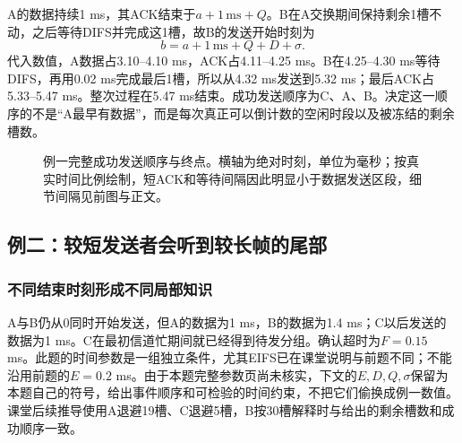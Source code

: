 A的数据持续1 ms，其ACK结束于$a+1\,\mathrm{ms}+Q$。B在A交换期间保持剩余1槽不动，之后等待DIFS并完成这1槽，故B的发送开始时刻为
\begin{equation}
b=a+1\,\mathrm{ms}+Q+D+\sigma.
\end{equation}
代入数值，A数据占3.10--4.10 ms，ACK占4.11--4.25 ms。B在4.25--4.30 ms等待DIFS，再用0.02 ms完成最后1槽，所以从4.32 ms发送到5.32 ms；最后ACK占5.33--5.47 ms。整次过程在5.47 ms结束。成功发送顺序为C、A、B。决定这一顺序的不是“A最早有数据”，而是每次真正可以倒计数的空闲时段以及被冻结的剩余槽数。

\begin{figure}[htbp]
\centering
{}
\caption{例一完整成功发送顺序与终点。横轴为绝对时刻，单位为毫秒；按真实时间比例绘制，短ACK和等待间隔因此明显小于数据发送区段，细节间隔见前图与正文。}
\end{figure}

\subsection{例二：较短发送者会听到较长帧的尾部}

\subsubsection{不同结束时刻形成不同局部知识}

A与B仍从0同时开始发送，但A的数据为1 ms，B的数据为1.4 ms；C以后发送的数据为1 ms。C在最初信道忙期间就已经得到待发分组。确认超时为$F=0.15$ ms。此题的时间参数是一组独立条件，尤其EIFS已在课堂说明与前题不同；不能沿用前题的$E=0.2$ ms。由于本题完整参数页尚未核实，下文的$E,D,Q,\sigma$保留为本题自己的符号，给出事件顺序和可检验的时间约束，不把它们偷换成例一数值。课堂后续推导使用A退避19槽、C退避5槽，B按30槽解释时与给出的剩余槽数和成功顺序一致。

